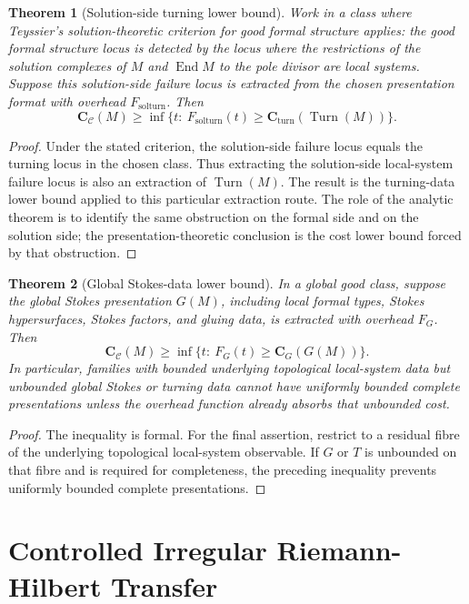 \documentclass[11pt]{article}
\newtheorem{theorem}{Theorem}[section]
\begin{document}
\begin{theorem}[Solution-side turning lower bound]
Work in a class where Teyssier's solution-theoretic criterion for good formal structure applies: the good formal structure locus is detected by the locus where the restrictions of the solution complexes of \(M\) and \(\operatorname{End}M\) to the pole divisor are local systems.  Suppose this solution-side failure locus is extracted from the chosen presentation format with overhead \(F_{\operatorname{solturn}}\).  Then
\[
\mathbf C_{\mathcal C}(M)
\ge
\inf\{t:\ F_{\operatorname{solturn}}(t)\ge
\mathbf C_{\operatorname{turn}}(\operatorname{Turn}(M))\}.
\]
\end{theorem}

\begin{proof}
Under the stated criterion, the solution-side failure locus equals the turning locus in the chosen class.  Thus extracting the solution-side local-system failure locus is also an extraction of \(\operatorname{Turn}(M)\).  The result is the turning-data lower bound applied to this particular extraction route.  The role of the analytic theorem is to identify the same obstruction on the formal side and on the solution side; the presentation-theoretic conclusion is the cost lower bound forced by that obstruction.
\end{proof}

\begin{theorem}[Global Stokes-data lower bound]
In a global good class, suppose the global Stokes presentation \(G(M)\), including local formal types, Stokes hypersurfaces, Stokes factors, and gluing data, is extracted with overhead \(F_G\).  Then
\[
\mathbf C_{\mathcal C}(M)
\ge
\inf\{t:\ F_G(t)\ge \mathbf C_G(G(M))\}.
\]
In particular, families with bounded underlying topological local-system data but unbounded global Stokes or turning data cannot have uniformly bounded complete presentations unless the overhead function already absorbs that unbounded cost.
\end{theorem}

\begin{proof}
The inequality is formal.  For the final assertion, restrict to a residual fibre of the underlying topological local-system observable.  If \(G\) or \(T\) is unbounded on that fibre and is required for completeness, the preceding inequality prevents uniformly bounded complete presentations.
\end{proof}

\section{Controlled Irregular Riemann-Hilbert Transfer}
\end{document}

